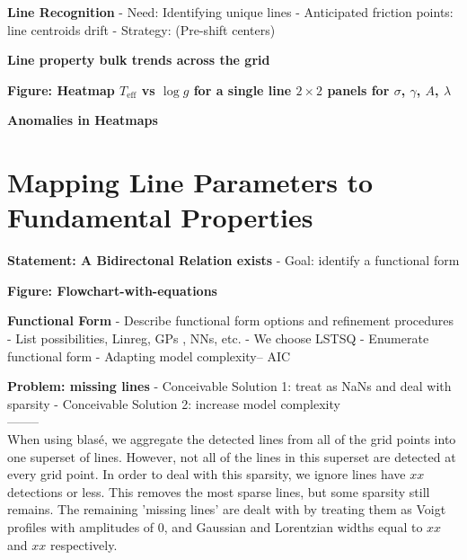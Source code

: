 \documentclass[twocolumn]{aastex631}
\begin{document}
\begin{mdframed}
    \textbf{Line Recognition}
    - Need: Identifying unique lines
    - Anticipated friction points: line centroids drift
    - Strategy: (Pre-shift centers)
    \textcolor{lightgray}{\blindtext}
\end{mdframed}

\begin{mdframed}
    \textbf{Line property bulk trends across the grid}
    \textcolor{lightgray}{\blindtext}
\end{mdframed}

\begin{mdframed}
    \textbf{Figure: Heatmap $T_\mathrm{eff}$ vs $\log{g}$ for a single line $2\times2$ panels for $\sigma$, $\gamma$, $A$, $\lambda$ }
\end{mdframed}

\begin{mdframed}
    \textbf{Anomalies in Heatmaps}
    \textcolor{lightgray}{\blindtext}
\end{mdframed}

\section{Mapping Line Parameters to Fundamental Properties}
\begin{mdframed}
    \textbf{Statement: A Bidirectonal Relation exists}
    - Goal: identify a functional form
    \textcolor{lightgray}{\blindtext}
\end{mdframed}

\begin{mdframed}
    \textbf{Figure: Flowchart-with-equations}
\end{mdframed}

\begin{mdframed}
    \textbf{Functional Form}
    - Describe functional form options and refinement procedures
    - List possibilities, Linreg, GPs \citep{2023ARA&A..61..329A}, NNs, etc.
    - We choose LSTSQ
    - Enumerate functional form
    - Adapting model complexity-- AIC
    \textcolor{lightgray}{\blindtext}
\end{mdframed}

\begin{mdframed}
    \textbf{Problem: missing lines}
    - Conceivable Solution 1: treat as NaNs and deal with sparsity
    - Conceivable Solution 2: increase model complexity
    \\--------\\
    When using blas\'e, we aggregate the detected lines from all of the grid points
    into one superset of lines. However, not all of the lines in this superset are
    detected at every grid point. In order to deal with this sparsity, we ignore lines
    have $xx$ detections or less. This removes the most sparse lines, but some sparsity still
    remains. The remaining 'missing lines' are dealt with by treating them as Voigt profiles
    with amplitudes of 0, and Gaussian and Lorentzian widths equal to $xx$ and $xx$ respectively.
\end{mdframed}
\end{document}
